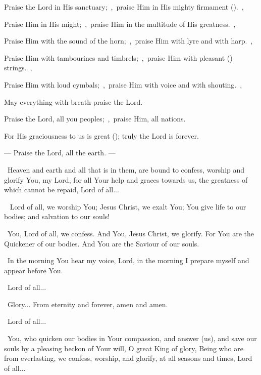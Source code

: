 \documentclass[12pt,twoside,a5paper]{article}
\begin{document}
\begin{halfparskip}
   Praise the Lord in His sanctuary;~\sep\ praise Him in His mighty firmament ().~\sep

  Praise Him in His might;~\sep\ praise Him in the multitude of His greatness.~\sep

  Praise Him with the sound of the horn;~\sep\ praise Him with lyre and with harp.~\sep

  Praise Him with tambourines and timbrels;~\sep\ praise Him with pleasant () strings.~\sep

  Praise Him with loud cymbals;~\sep\ praise Him with voice and with shouting.~\sep

  May everything with breath praise the Lord.

   Praise the Lord, all you peoples;~\sep\ praise Him, all nations.

  For His graciousness to us is great (); truly the Lord is forever.

   --- Praise the Lord, all the earth. --- 
\end{halfparskip}


\cc~Heaven and earth and all that is in them, are bound to confess, worship and glorify You, my Lord, for all Your help and graces towards us, the greatness of which cannot be repaid, Lord of all...


\begin{doublecols}
  \englishl \rr~ Lord of all, we worship You; Jesus Christ, we exalt You; You give life to our bodies; and salvation to our souls!

   \rr~You, Lord of all, we confess. And You, Jesus Christ, we glorify. For You are the Quickener of our bodies. And You are the Saviour of our souls.
\end{doublecols}

\dd~In the morning You hear my voice, Lord, in the morning I prepare myself and appear before You.

\rr~Lord of all...

\cc~Glory... From eternity and forever, amen and amen.

\rr~Lord of all...


\cc~You, who quicken our bodies in Your compassion, and answer (us), and save our souls by a pleasing beckon of Your will, O great King of glory, Being who are from everlasting, we confess, worship, and glorify, at all seasons and times, Lord of all...

\end{document}
